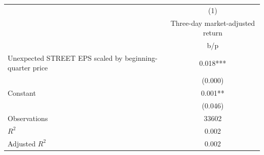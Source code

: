 {
\def\sym#1{\ifmmode^{#1}\else\(^{#1}\)\fi}
\begin{tabular}{l*{1}{c}}
\hline\hline
                    &\multicolumn{1}{c}{(1)}\\
                    &\multicolumn{1}{c}{Three-day market-adjusted return}\\
                    &         b/p   \\
\hline
Unexpected STREET EPS scaled by beginning-quarter price&       0.018***\\
                    &     (0.000)   \\
Constant            &       0.001** \\
                    &     (0.046)   \\
\hline
Observations        &       33602   \\
\(R^{2}\)           &       0.002   \\
Adjusted \(R^{2}\)  &       0.002   \\
\hline\hline
\end{tabular}
}
